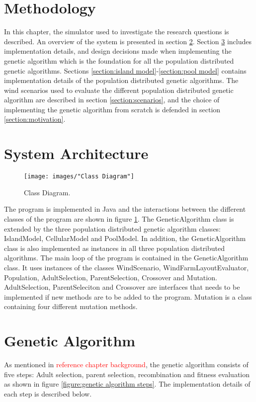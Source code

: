 \documentclass{article}
\begin{document}
\section{Methodology}\label{chapter:methodology}%
In this chapter, the simulator used to investigate the research questions is described. An overview of the system is presented in section \ref{section:systemt architecture}. Section \ref{section:genetic algorithm} includes implementation details, and design decisions made when implementing the genetic algorithm which is the foundation for all the population distributed genetic algorithms. Sections \ref{section:island model}-\ref{section:pool model} contains implementation details of the population distributed genetic algorithms. The wind scenarios used to evaluate the different population distributed genetic algorithm are described in section \ref{section:scenarios}, and the choice of implementing the genetic algorithm from scratch is defended in section \ref{section:motivation}.


\section{System Architecture}\label{section:systemt architecture}


\begin{figure}[h!]
\begin{center}
\texttt{[image: images/"Class Diagram"]}
\caption{Class Diagram.}
\label{figure:class diagram}
\end{center}
\end{figure}


The program is implemented in Java and the interactions between the different classes of the program are shown in figure \ref{figure:class diagram}. The GeneticAlgorithm class is extended by the three population distributed genetic algorithm classes: IslandModel, CellularModel and PoolModel. In addition, the GeneticAlgorithm class is also implemented as instances in all three population distributed algorithms. The main loop of the program is contained in the GeneticAlgorithm class. It uses instances of the classes WindScenario, WindFarmLayoutEvaluator, Population, AdultSelection, ParentSelection, Crossover and Mutation. AdultSelection, ParentSeleciton and Crossover are interfaces that needs to be implemented if new methods are to be added to the program. Mutation is a class containing four different mutation methods. 


\section{Genetic Algorithm}\label{section:genetic algorithm}
As mentioned in \textcolor{red}{reference chapter background}, the genetic algorithm consists of five steps: Adult selection, parent selection, recombination and fitness evaluation as shown in figure \ref{figure:genetic algorithm steps}. The implementation details of each step is described below.
\end{document}

